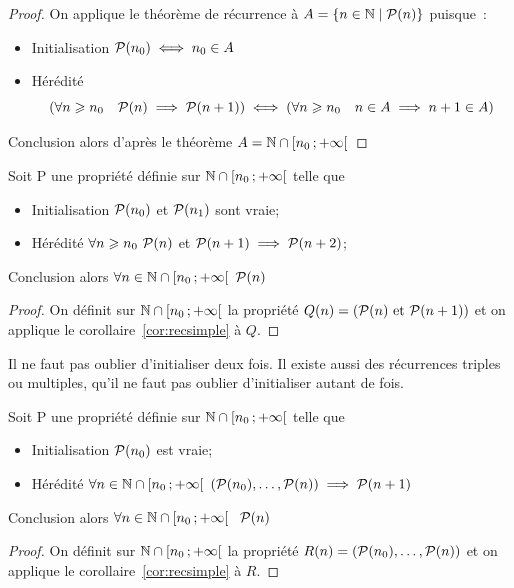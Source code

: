 \begin{proof}
  On applique le théorème de récurrence à \(A=\enstq{n\in\N}{\P(n)}\) puisque~:
  \begin{itemize}
  \item Initialisation \(\P(n_0) \iff n_0 \in A\)
  \item Hérédité
    \begin{equation}
      \left(\forall n\geqslant n_0 \quad \P(n) \implies \P(n+1)\right) \iff \left( \forall n \geqslant n_0 \quad n\in A \implies n+1\in A\right)
    \end{equation}
  \end{itemize}
  Conclusion alors d'après le théorème \(A=\N\cap \intervallefo{n_0}{+\infty}\)
\end{proof}
\begin{cor}
  \label{cor:recdouble}
  Soit P une propriété définie sur \(\N\cap \intervallefo{n_0}{+\infty}\) telle que
 \begin{itemize}
  \item Initialisation \(\P(n_0)\) et \(\P(n_1)\) sont vraie;
  \item Hérédité \(\forall n\geqslant n_0 \ \P(n)\) et \(\P(n+1) \implies \P(n+2)\);
  \end{itemize}
  Conclusion alors \(\forall n \in \N\cap \intervallefo{n_0}{+\infty} \ \P(n)\) 
\end{cor}
\begin{proof}
  On définit sur \(\N\cap \intervallefo{n_0}{+\infty}\) la propriété \(Q(n)=(\P(n) \text{ et } \P(n+1))\) et on applique le corollaire~\ref{cor:recsimple} à \(Q\).
\end{proof}
Il ne faut pas oublier d'initialiser deux fois. Il existe aussi des récurrences triples ou multiples, qu'il ne faut pas oublier d'initialiser autant de fois.
\begin{cor}
  \label{cor:recforte}
  Soit P une propriété définie sur \(\N\cap \intervallefo{n_0}{+\infty}\) telle que
  \begin{itemize}
  \item Initialisation \(\P(n_0)\) est vraie;
  \item Hérédité \(\forall n \in \N\cap \intervallefo{n_0}{+\infty} \ (\P(n_0), \ldots, \P(n)) \implies \P(n+1)\)
  \end{itemize}
  Conclusion alors \(\forall n \in \N\cap \intervallefo{n_0}{+\infty}\ \ \P(n)\)
\end{cor}
\begin{proof}
  On définit sur \(\N\cap \intervallefo{n_0}{+\infty}\) la propriété \(R(n)=(\P(n_0), \ldots, \P(n))\) et on applique le corollaire~\ref{cor:recsimple} à \(R\).
\end{proof}

